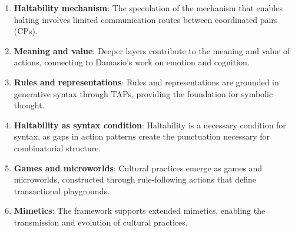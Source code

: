 \begin{enumerate}
    \item \textbf{Haltability mechanism}: The speculation of the mechanism that enables halting involves limited communication routes between coordinated pairs (CPs).
    
    \item \textbf{Meaning and value}: Deeper layers contribute to the meaning and value of actions, connecting to Damasio's work on emotion and cognition.
    
    \item \textbf{Rules and representations}: Rules and representations are grounded in generative syntax through TAPs, providing the foundation for symbolic thought.
    
    \item \textbf{Haltability as syntax condition}: Haltability is a necessary condition for syntax, as gaps in action patterns create the punctuation necessary for combinatorial structure.
    
    \item \textbf{Games and microworlds}: Cultural practices emerge as games and microworlds, constructed through rule-following actions that define transactional playgrounds.
    
    \item \textbf{Mimetics}: The framework supports extended mimetics, enabling the transmission and evolution of cultural practices.
\end{enumerate}

